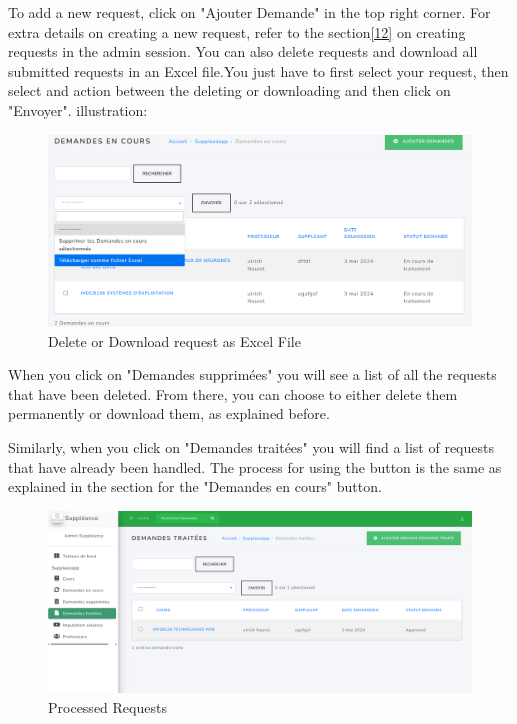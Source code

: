 \documentclass[12pt]{article}
\begin{document}
To add a new request, click on "Ajouter Demande" in the top right corner. For extra details on creating a new request, refer to the section\textcolor{blue}{\ref{12}} on creating requests in the admin session. You can also delete requests and download all submitted requests in an Excel file.You just have to first select your request, then select and action  between the deleting or downloading and then click on "Envoyer". illustration: 
\begin{figure}[H]
    \centering
    \includegraphics[width=0.75\linewidth]{image31.png}
    \caption{Delete or Download request as Excel File}
\end{figure}
When you click on "Demandes supprimées" you will see a list of all the requests that have been deleted. From there, you can choose to either delete them permanently or download them, as explained before.

Similarly, when you click on "Demandes traitées" you will find a list of requests that have already been handled. The process for using the button is the same as explained in the section for the "Demandes en cours" button.

\begin{figure}[H]
    \centering
    \includegraphics[width=0.75\linewidth]{image33.png}
    \caption{Processed Requests}
\end{figure}
\end{document}

